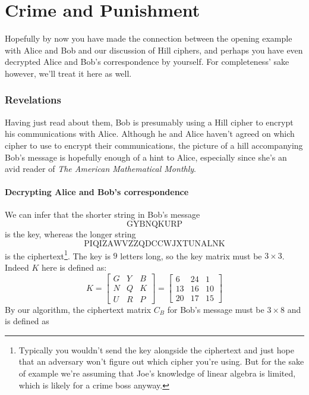 \documentclass{paper}
\begin{document}
\newpage

\part{Crime and Punishment}

Hopefully by now you have made the connection between the opening example with Alice and Bob and our discussion of Hill ciphers, and perhaps you have even decrypted Alice and Bob's correspondence by yourself. For completeness' sake however, we'll treat it here as well.


\section{Revelations}
\medskip
Having just read about them, Bob is presumably using a Hill cipher to encrypt his communications with Alice. Although he and Alice haven't agreed on which cipher to use to encrypt their communications, the picture of a hill accompanying Bob's message is hopefully enough of a hint to Alice, especially since she's an avid reader of \textit{The American Mathematical Monthly}. 

\subsection{Decrypting Alice and Bob's correspondence}
We can infer that the shorter string in Bob's message
\[ \mathrm{GYBNQKURP} \]
is the key, whereas the longer string
\[ \mathrm{PIQIZAWVZZQDCCWJXTUNALNK} \]
is the ciphertext\footnote{Typically you wouldn't send the key alongside the ciphertext and just hope that an adversary won't figure out which cipher you're using. But for the sake of example we're assuming that Joe's knowledge of linear algebra is limited, which is likely for a crime boss anyway.}. The key is $9$ letters long, so the key matrix must be $3 \times 3$. Indeed $K$ here is defined as:
\[ K = \begin{bmatrix}G & Y & B \\ N & Q & K \\ U & R & P\end{bmatrix} = \begin{bmatrix}6 & 24 & 1 \\ 13 & 16 & 10 \\ 20 & 17 & 15\end{bmatrix} \]
By our algorithm, the ciphertext matrix $C_B$ for Bob's message must be $3 \times 8$ and is defined as
\end{document}
